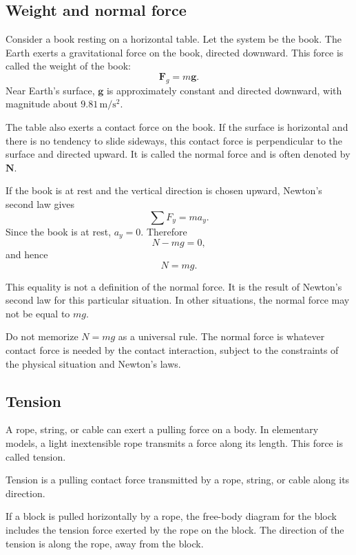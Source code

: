 \subsection{Weight and normal force}

Consider a book resting on a horizontal table. Let the system be the book. The Earth exerts a gravitational force on the book, directed downward. This force is called the weight of the book:
\[
\mathbf{F}_g=m\mathbf{g}.
\]
Near Earth's surface, \(\mathbf{g}\) is approximately constant and directed downward, with magnitude about \(9.81\,\mathrm{m/s^2}\).

The table also exerts a contact force on the book. If the surface is horizontal and there is no tendency to slide sideways, this contact force is perpendicular to the surface and directed upward. It is called the normal force and is often denoted by \(\mathbf{N}\).

If the book is at rest and the vertical direction is chosen upward, Newton's second law gives
\[
\sum F_y=ma_y.
\]
Since the book is at rest, \(a_y=0\). Therefore
\[
N-mg=0,
\]
and hence
\[
N=mg.
\]

This equality is not a definition of the normal force. It is the result of Newton's second law for this particular situation. In other situations, the normal force may not be equal to \(mg\).

\begin{remarkbox}
Do not memorize \(N=mg\) as a universal rule. The normal force is whatever contact force is needed by the contact interaction, subject to the constraints of the physical situation and Newton's laws.
\end{remarkbox}

\subsection{Tension}

A rope, string, or cable can exert a pulling force on a body. In elementary models, a light inextensible rope transmits a force along its length. This force is called tension.

\begin{definitionbox}
Tension is a pulling contact force transmitted by a rope, string, or cable along its direction.
\end{definitionbox}

If a block is pulled horizontally by a rope, the free-body diagram for the block includes the tension force exerted by the rope on the block. The direction of the tension is along the rope, away from the block.

